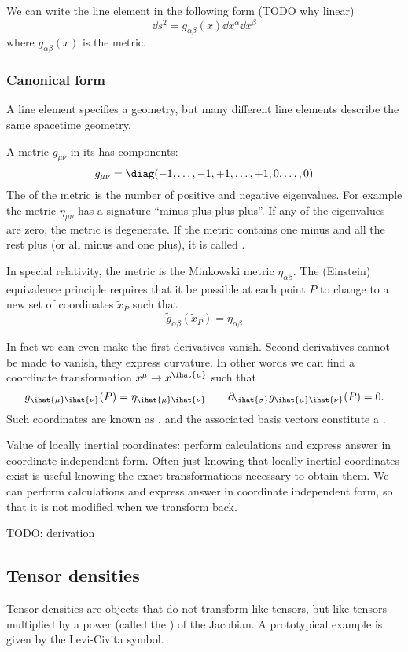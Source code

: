 We can write the line element in the following form (TODO why linear)
\[ \dd{s}^2 = g_{\alpha\beta}(x)\dd{x^\alpha}\dd{x^\beta} \]
where $g_{\alpha\beta}(x)$ is the metric.

\subsubsection{Canonical form}
A line element specifies a geometry, but many different line elements describe the same spacetime geometry.

A metric $g_{\mu\nu}$ in its  has components:
\[ g_{\mu\nu} = \diag(-1,\ldots,-1,+1,\ldots,+1,0,\ldots,0) \]
The  of the metric is the number of positive and negative eigenvalues. For example the metric $\eta_{\mu\nu}$ has a signature ``minus-plus-plus-plus''. If any of the eigenvalues are zero, the metric is degenerate. If the metric contains one minus and all the rest plus (or all minus and one plus), it is called .


In special relativity, the metric is the Minkowski metric $\eta_{\alpha\beta}$. The (Einstein) equivalence principle requires that it be possible at each point $P$ to change to a new set of coordinates $\tilde{x}_P$ such that
\[ \tilde{g}_{\alpha\beta}(\tilde{x}_P) = \eta_{\alpha\beta} \]

In fact we can even make the first derivatives vanish. Second derivatives cannot be made to vanish, they express curvature. In other words we can find a coordinate transformation $x^\mu \to x^{\ihat{\mu}}$ such that
\[g_{\ihat{\mu}\ihat{\nu}}(P) = \eta_{\ihat{\mu}\ihat{\nu}} \qquad \partial_{\ihat{\sigma}}g_{\ihat{\mu}\ihat{\nu}}(P) = 0.\]
Such coordinates are known as , and the associated basis vectors constitute a . 

Value of locally inertial coordinates: perform calculations and express answer in coordinate independent form. Often just knowing that locally inertial coordinates exist is useful knowing the exact transformations necessary to obtain them. We can perform calculations and express answer in coordinate independent form, so that it is not modified when we transform back.

\begin{note}
TODO: derivation
\end{note}

\subsection{Tensor densities}
Tensor densities are objects that do not transform like tensors, but like tensors multiplied by a power (called the ) of the Jacobian. A prototypical example is given by the Levi-Civita symbol.

